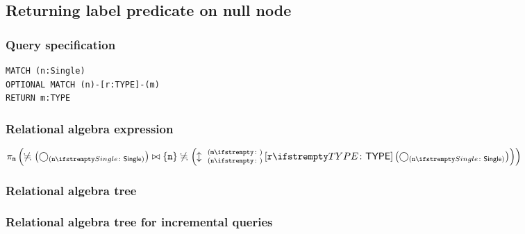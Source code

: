 \subsection{Returning label predicate on null node}

\subsubsection*{Query specification}

\begin{lstlisting}
MATCH (n:Single)
OPTIONAL MATCH (n)-[r:TYPE]-(m)
RETURN m:TYPE
\end{lstlisting}

\subsubsection*{Relational algebra expression}

$\projection{\var{m}} \left(\alldifferent{} \left(\getvertices{n}{Single}\right) \join \{\var{n}\} \alldifferent{} \left(\expandboth{n}{m}{}{r}{TYPE} \left(\getvertices{n}{Single}\right)\right)\right)$

\subsubsection*{Relational algebra tree}


\subsubsection*{Relational algebra tree for incremental queries}


